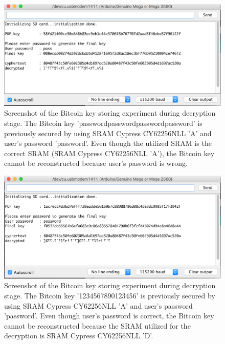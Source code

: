 \begin{figure}[tph!]
    \centerline{\includegraphics[width={\textwidth}]{images/A_decrypt_wrong_password}}
    \caption{Screenshot of the Bitcoin key storing experiment during decryption stage. The Bitcoin key 'passwordpasswordpasswordpassword' is previously secured by using SRAM Cypress CY62256NLL 'A' and user's password 'password'.
    Even though the utilized SRAM is the correct SRAM (SRAM Cypress CY62256NLL 'A'), the Bitcoin key cannot be reconstructed because user's password is wrong.}
    \label{fig:A_decrypt_wrong_password}
\end{figure}

\begin{figure}[tph!]
    \centerline{\includegraphics[width={\textwidth}]{images/A_decrypt_wrong_SRAM}}
    \caption{Screenshot of the Bitcoin key storing experiment during decryption stage. The Bitcoin key '1234567890123456' is previously secured by using SRAM Cypress CY62256NLL 'A' and user's password 'password'.
    Even though user's password is correct, the Bitcoin key cannot be reconstructed because the SRAM utilized for the decryption is SRAM Cypress CY62256NLL 'D'.}
    \label{fig:A_decrypt_wrong_SRAM}
\end{figure}

